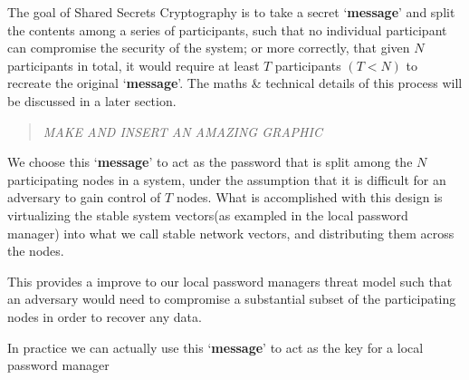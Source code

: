 \documentclass[11pt]{article} %
\def\ssc{Shared Secrets Cryptography\xspace}
\def\ssv{stable system vectors\xspace}
\def\snv{stable network vectors\xspace}
\def\pm{password manager\xspace}
\def\lpm{local \pm}
\def\tm{threat model\xspace}
\def\m{`{\bf message}'\xspace}
\begin{document}
The goal of \ssc is to take a secret \m and split the contents among a series of participants, such that no individual participant can compromise the security of the system; or more correctly, that given \(N\) participants in total, it would require at least \(T\) participants \(\left( T < N \right)\) to recreate the original \m. The maths \& technical details of this process will be discussed in a later section.

\begin{quote}{\em MAKE AND INSERT AN AMAZING GRAPHIC}\end{quote}


We choose this \m to act as the password that is split among the \(N\) participating nodes in a system, under the assumption that it is difficult for an adversary to gain control of \(T\) nodes. What is accomplished with this design is virtualizing the \ssv (as exampled in the \lpm) into what we call \snv, and distributing them across the nodes. 

This provides a improve to our \lpm{s} \tm such that an adversary would need to compromise a substantial subset of the participating nodes in order to recover any data.

In practice we can actually use this \m to act as the key for a \lpm
\end{document}
